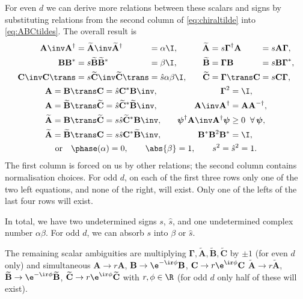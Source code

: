 \documentclass[11pt]{article}
\newcommand{\invd}{^{-\dag}}
\newcommand{\Gammab}{\boldsymbol{\Gamma}}
\newcommand{\A}{\mathbf{A}}
\newcommand{\B}{\mathbf{B}}
\renewcommand{\C}{\mathbf{C}}
\newcommand{\At}{\widetilde{\mathbf{A}}}
\newcommand{\Bt}{\widetilde{\mathbf{B}}}
\newcommand{\Ct}{\widetilde{\mathbf{C}}}
\newcommand{\psib}{\boldsymbol{\psi}}
\begin{document}
For even $d$ we can derive more relations between these scalars and signs by substituting relations from the second column of \cref{eq:chiraltilde} into \cref{eq:ABCtildes}.
The overall result is
%
\begin{equation}\label{eq:constnorm}
\begin{gathered}
\begin{alignedat}{4}
  \A\inv \A^\dag &= \At\inv \At^\dag &
        &= \alpha \I, &
    \At &= s \Gammab^\dag \A &
        &= s \A \Gammab,
  \\
  \B \B^\ast &= s \Bt \Bt^\ast &
        &= \beta \I, &
    \Bt &= \Gammab \B &
        &= s \B \Gammab^\ast,
  \\
  \C\inv \C\trans &= s \Ct\inv \Ct\trans &
        &= \hat{s} \alpha \beta \I, &\qquad
    \Ct &= \Gammab\trans \C &
        &= s \C \Gammab,
  \\
\end{alignedat}
\\
\begin{alignedat}{3}
  \A &= \B\trans \C &
        &= \hat{s} \C^\ast \B\inv, &\qquad
    \Gammab^2 &= \I,
  \\
  \A &= \Bt\trans \Ct &
        &= \hat{s} \Ct^\ast \Bt\inv, &\qquad
    \A\inv \A^\dag &= \A \A\invd,
  \\
  \At &= \B\trans \Ct &
        &= s \hat{s} \Ct^\ast \B\inv, &\qquad
    \psib^\dag \A\inv \A^\dag \psib &\geq 0 \;\; \forall \, \psib,
  \\
  \At &= \Bt\trans \C &
        &= s \hat{s} \C^\ast \Bt\inv, &
    \B^\ast \B^2 \B^\ast &= \I, 
\end{alignedat}
\\
  \text{or}\quad
  \phase(\alpha) = 0, \qquad
  \abs{\beta} = 1, \qquad
  s^2 = \hat{s}^2 = 1.
\end{gathered}
\end{equation}
%
The first column is forced on us by other relations; the second column contains normalisation choices.
For odd $d$, on each of the first three rows only one of the two left equations, and none of the right, will exist.
Only one of the lefts of the last four rows will exist.

In total, we have two undetermined signs $s$, $\hat{s}$, and one undetermined complex number $\alpha \beta$.
For odd $d$, we can absorb $s$ into $\beta$ or $\hat{s}$.

The remaining scalar ambiguities are multiplying $\Gammab,\At,\Bt,\Ct$ by $\pm1$ (for even $d$ only)
and simultaneous \( \A \rightarrow r \A \),
\( \B \rightarrow \e^{-\ir\phi} \B \), \( \C \rightarrow r\e^{\ir\phi} \C \)
\( \At \rightarrow r \At \), \( \Bt \rightarrow \e^{-\ir\phi} \Bt \),
\( \Ct \rightarrow r\e^{\ir\phi} \Ct \) with \( r, \phi \in \R \) (for odd $d$ only half of these will exist).
\end{document}
